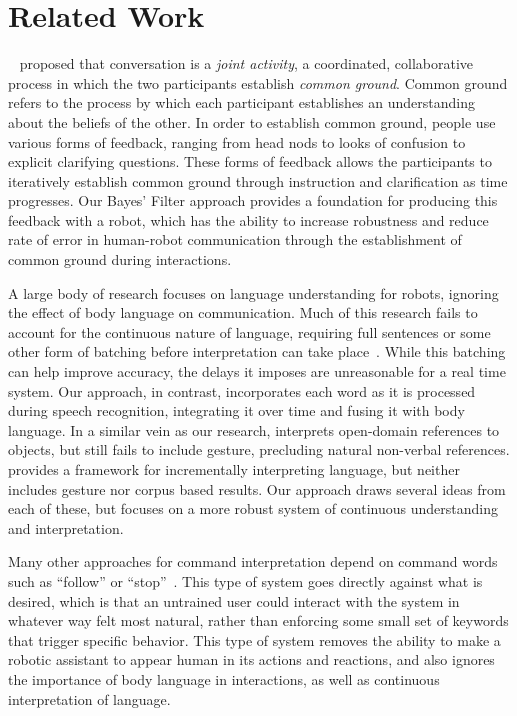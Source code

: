 \documentclass[a4paper, 11pt]{article} %
\begin{document}
\section{Related Work}
~\citet{clark96} proposed that conversation is a \textit{joint activity}, a coordinated, collaborative process in which the two participants establish \textit{common ground}. Common ground refers to the process by which each participant establishes an understanding about the beliefs of the other. In order to establish common ground, people use various forms of feedback, ranging from head nods to looks of confusion to explicit clarifying questions. These forms of feedback allows the participants to iteratively establish common ground through instruction and clarification as time progresses. Our Bayes' Filter approach provides a foundation for producing this feedback with a robot, which has the ability to increase robustness and reduce rate of error in human-robot communication through the establishment of common ground during interactions.

A large body of research focuses on language understanding for robots, ignoring the effect of body language on communication. Much of this research fails to account for the continuous nature of language, requiring full sentences or some other form of batching before interpretation can take place~\citep{dzifcak09, kollar10, macmahon06, matuszek12}. While this batching can help improve accuracy, the delays it imposes are unreasonable for a real time system. Our approach, in contrast, incorporates each word as it is processed during speech recognition, integrating it over time and fusing it with body language. In a similar vein as our research, \citet{guadarrama14} interprets open-domain references to objects, but still fails to include gesture, precluding natural non-verbal references. \citet{cantrell10} provides a framework for incrementally interpreting language, but neither includes gesture nor corpus based results. Our approach draws several ideas from each of these, but focuses on a more robust system of continuous understanding and interpretation.

Many other approaches for command interpretation depend on command words such as ``follow'' or ``stop''~\citep{marge11, waldherr00}. This type of system goes directly against what is desired, which is that an untrained user could interact with the system in whatever way felt most natural, rather than enforcing some small set of keywords that trigger specific behavior. This type of system removes the ability to make a robotic assistant to appear human in its actions and reactions, and also ignores the importance of body language in interactions, as well as continuous interpretation of language.
\end{document}
